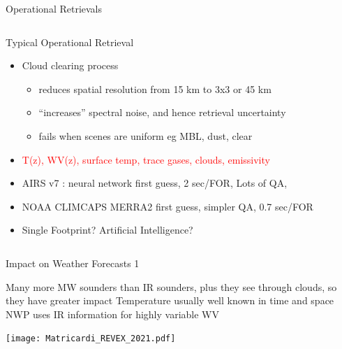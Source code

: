 \documentclass[10pt,t]{beamer}
\begin{document}
\begin{frame}[shrink=2]{Operational Retrievals}
\begin{columns}
\begin{column}{0.55\columnwidth}
\begin{block}{Typical Operational Retrieval}
  \begin{itemize}
    \item Cloud clearing process 
       \begin{itemize}
          \item reduces spatial resolution from 15 km to 3x3 or 45 km
          \item ``increases'' spectral noise, and hence retrieval uncertainty
          \item fails when scenes are uniform eg MBL, dust, clear
       \end{itemize}
    \item \textcolor{red}{T(z), WV(z), surface temp, trace gases, clouds, emissivity}
    \item AIRS v7 : neural network first guess, 2 sec/FOR, Lots of QA, 
    \item NOAA CLIMCAPS MERRA2 first guess, simpler QA, 0.7 sec/FOR
    \item Single Footprint? Artificial Intelligence?
  \end{itemize}
\end{block}
\end{column}
\end{columns}
\end{frame}


\begin{frame}{Impact on Weather Forecasts 1}
\begin{block}{}
\footnotesize Many more MW sounders than IR sounders, plus they see through clouds, so they have greater impact \newline
\footnotesize Temperature usually well known in time and space \newline
\footnotesize NWP uses IR information for highly variable WV \newline
\vspace{-0.4in}
\begin{center}
%
\texttt{[image: Matricardi\_REVEX\_2021.pdf]}
\end{center}
\end{block}
\end{frame}
\end{document}
